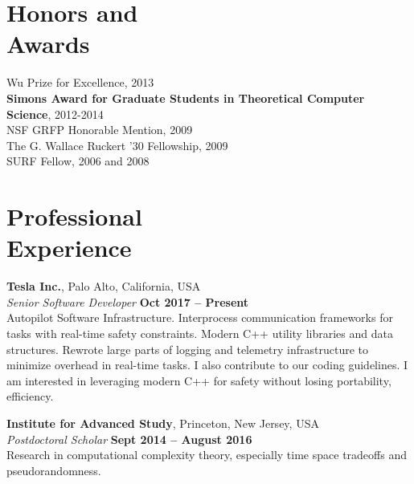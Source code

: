 \documentclass[margin,line]{resume}
\begin{document}
\begin{resume}
    \section{\mysidestyle Honors and\\Awards} 

    Wu Prize for Excellence, 2013 \vspace{1mm}\\
    {\bf Simons Award for Graduate Students in Theoretical Computer Science}, 2012-2014		    \vspace{1mm}\\
    NSF GRFP Honorable Mention, 2009								    \vspace{1mm}\\%
    The G. Wallace Ruckert '30 Fellowship, 2009 						    \vspace{1mm}\\%
    SURF Fellow, 2006 and 2008									    \vspace{1mm}\\%
    
    \section{\mysidestyle Professional\\Experience}

    \textbf{Tesla Inc.}, Palo Alto, California, USA \vspace{2mm}\\\vspace{1mm}%
    \textsl{Senior Software Developer} \hfill \textbf{Oct 2017 -- Present}\\
    Autopilot Software Infrastructure. Interprocess communication frameworks for tasks with real-time safety constraints.
    Modern C++ utility libraries and data structures. Rewrote large parts of logging and telemetry infrastructure to
    minimize overhead in real-time tasks. I also contribute to our coding guidelines. I am interested in
    leveraging modern C++ for safety without losing portability, efficiency.

    \textbf{Institute for Advanced Study}, Princeton, New Jersey, USA \vspace{2mm}\\\vspace{1mm}%
    \textsl{Postdoctoral Scholar} \hfill \textbf{Sept 2014 -- August 2016}\\
    Research in computational complexity theory, especially time space tradeoffs and pseudorandomness.


\end{resume}
\end{document}
